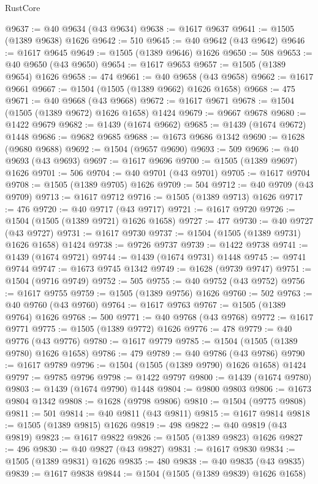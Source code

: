 \begin{lexlean}{RustCore}
\begin{coremodule}
@9637 := @40 @9634 (@43 @9634)
@9638 := @1617 @9637
@9641 := @1505 (@1389 @9638) @1626
@9642 := 510
@9645 := @40 @9642 (@43 @9642)
@9646 := @1617 @9645
@9649 := @1505 (@1389 @9646) @1626
@9650 := 508
@9653 := @40 @9650 (@43 @9650)
@9654 := @1617 @9653
@9657 := @1505 (@1389 @9654) @1626
@9658 := 474
@9661 := @40 @9658 (@43 @9658)
@9662 := @1617 @9661
@9667 := @1504 (@1505 (@1389 @9662) @1626 @1658)
@9668 := 475
@9671 := @40 @9668 (@43 @9668)
@9672 := @1617 @9671
@9678 := @1504 (@1505 (@1389 @9672) @1626 @1658) @1424
@9679 := @9667 @9678
@9680 := @1422 @9679
@9682 := @1439 (@1674 @9662)
@9685 := @1439 (@1674 @9672) @1448
@9686 := @9682 @9685
@9688 := @1673 @9686 @1342
@9690 := @1628 (@9680 @9688)
@9692 := @1504 (@9657 @9690)
@9693 := 509
@9696 := @40 @9693 (@43 @9693)
@9697 := @1617 @9696
@9700 := @1505 (@1389 @9697) @1626
@9701 := 506
@9704 := @40 @9701 (@43 @9701)
@9705 := @1617 @9704
@9708 := @1505 (@1389 @9705) @1626
@9709 := 504
@9712 := @40 @9709 (@43 @9709)
@9713 := @1617 @9712
@9716 := @1505 (@1389 @9713) @1626
@9717 := 476
@9720 := @40 @9717 (@43 @9717)
@9721 := @1617 @9720
@9726 := @1504 (@1505 (@1389 @9721) @1626 @1658)
@9727 := 477
@9730 := @40 @9727 (@43 @9727)
@9731 := @1617 @9730
@9737 := @1504 (@1505 (@1389 @9731) @1626 @1658) @1424
@9738 := @9726 @9737
@9739 := @1422 @9738
@9741 := @1439 (@1674 @9721)
@9744 := @1439 (@1674 @9731) @1448
@9745 := @9741 @9744
@9747 := @1673 @9745 @1342
@9749 := @1628 (@9739 @9747)
@9751 := @1504 (@9716 @9749)
@9752 := 505
@9755 := @40 @9752 (@43 @9752)
@9756 := @1617 @9755
@9759 := @1505 (@1389 @9756) @1626
@9760 := 502
@9763 := @40 @9760 (@43 @9760)
@9764 := @1617 @9763
@9767 := @1505 (@1389 @9764) @1626
@9768 := 500
@9771 := @40 @9768 (@43 @9768)
@9772 := @1617 @9771
@9775 := @1505 (@1389 @9772) @1626
@9776 := 478
@9779 := @40 @9776 (@43 @9776)
@9780 := @1617 @9779
@9785 := @1504 (@1505 (@1389 @9780) @1626 @1658)
@9786 := 479
@9789 := @40 @9786 (@43 @9786)
@9790 := @1617 @9789
@9796 := @1504 (@1505 (@1389 @9790) @1626 @1658) @1424
@9797 := @9785 @9796
@9798 := @1422 @9797
@9800 := @1439 (@1674 @9780)
@9803 := @1439 (@1674 @9790) @1448
@9804 := @9800 @9803
@9806 := @1673 @9804 @1342
@9808 := @1628 (@9798 @9806)
@9810 := @1504 (@9775 @9808)
@9811 := 501
@9814 := @40 @9811 (@43 @9811)
@9815 := @1617 @9814
@9818 := @1505 (@1389 @9815) @1626
@9819 := 498
@9822 := @40 @9819 (@43 @9819)
@9823 := @1617 @9822
@9826 := @1505 (@1389 @9823) @1626
@9827 := 496
@9830 := @40 @9827 (@43 @9827)
@9831 := @1617 @9830
@9834 := @1505 (@1389 @9831) @1626
@9835 := 480
@9838 := @40 @9835 (@43 @9835)
@9839 := @1617 @9838
@9844 := @1504 (@1505 (@1389 @9839) @1626 @1658)

\end{coremodule}
\end{lexlean}
